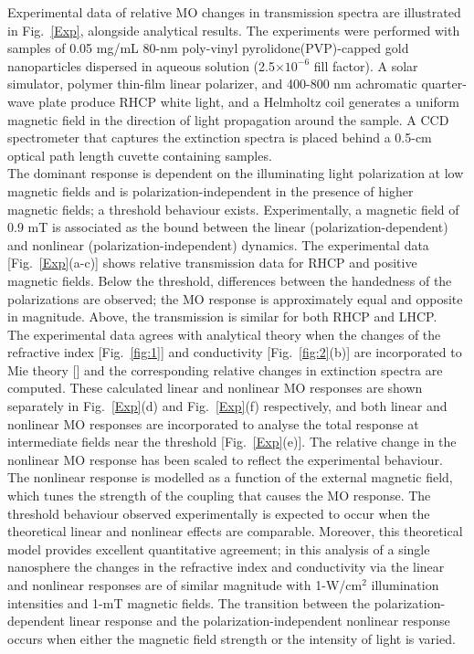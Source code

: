 \indent Experimental data of relative MO changes in transmission spectra are illustrated in Fig.~\ref{Exp}, alongside analytical results. The experiments were performed with samples of 0.05 mg/mL 80-nm poly-vinyl pyrolidone(PVP)-capped gold nanoparticles dispersed in aqueous solution (2.5$\times 10^{-6}$ fill factor). A solar simulator, polymer thin-film linear polarizer, and 400-800 nm achromatic quarter-wave plate produce RHCP white light, and a Helmholtz coil generates a uniform magnetic field in the direction of light propagation around the sample. A CCD spectrometer that captures the extinction spectra is placed behind a 0.5-cm optical path length cuvette containing samples.
\\\indent The dominant response is dependent on the illuminating light polarization at low magnetic fields and is polarization-independent in the presence of higher magnetic fields; a threshold behaviour exists. Experimentally, a magnetic field of 0.9 mT is associated as the bound between the linear (polarization-dependent) and nonlinear (polarization-independent) dynamics. The experimental data [Fig.~\ref{Exp}(a-c)] shows relative transmission data for RHCP and positive magnetic fields. Below the threshold, differences between the handedness of the polarizations are observed; the MO response is approximately equal and opposite in magnitude. Above, the transmission is similar for both RHCP and LHCP. 
\\\indent The experimental data agrees with analytical theory when the changes of the refractive index [Fig.~\ref{fig:1}] and conductivity [Fig.~\ref{fig:2}(b)] are incorporated to Mie theory [\cite{Mie}] and the corresponding relative changes in extinction spectra are computed. These calculated linear and nonlinear MO responses are shown separately in Fig.~\ref{Exp}(d) and Fig.~\ref{Exp}(f) respectively, and both linear and nonlinear MO responses are incorporated to analyse the total response at intermediate fields near the threshold [Fig.~\ref{Exp}(e)]. The relative change in the nonlinear MO response has been scaled to reflect the experimental behaviour. The nonlinear response is modelled as a function of the external magnetic field, which tunes the strength of the coupling that causes the MO response. The threshold behaviour observed experimentally is expected to occur when the theoretical linear and nonlinear effects are comparable. Moreover, this theoretical model provides excellent quantitative agreement; in this analysis of a single nanosphere the changes in the refractive index and conductivity via the linear and nonlinear responses are of similar magnitude with 1-W/cm$^2$ illumination intensities and 1-mT magnetic fields. The transition between the polarization-dependent linear response and the polarization-independent nonlinear response occurs when either the magnetic field strength or the intensity of light is varied.
